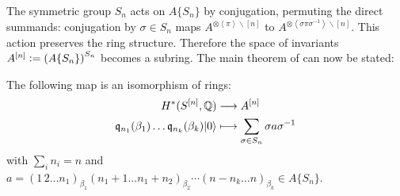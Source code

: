 The symmetric group $S_n$ acts on $A\{S_n\}$ by conjugation, permuting the direct summands: conjugation by $\sigma\in S_n$ maps $A^{\otimes\left<\pi\right>\backslash[n]}$ to $A^{\otimes\left<\sigma\pi\sigma^{{-}1}\right>\backslash[n]}$.
This action preserves the ring structure. Therefore the space of invariants $A^{[n]} \vcentcolon=  \left(A\{S_n\} \right)^{S_n}$ becomes a subring. The main theorem of \cite{LehnSorger} can now be stated:
\begin{theorem} \label{LSThm}\cite[Thm. 3.2.]{LehnSorger}
The following map is an isomorphism of rings:
\begin{align*}
H^\ast(S^{[n]},\mathbb{Q}) & \longrightarrow A^{[n]} \\
\mathfrak{q}_{n_1}(\beta_1)\ldots \mathfrak{q}_{n_k}(\beta_k) |0\rangle &\longmapsto \sum_{\sigma\in S_n} \sigma a \sigma^{{-}1} 
\end{align*}
with $\sum_i n_i=n$ and $a =(1\,2\ldots n_1)_{\beta_1}(n_1\! +\! 1\ldots n_1\!+\! n_2)_{\beta_2}\cdots (n\!-\!n_k \ldots n)_{\beta_k}\in A\{S_n\}$.
\end{theorem}

